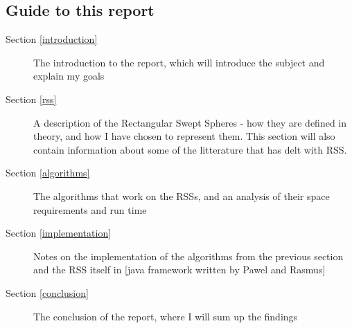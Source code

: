 \subsection{Guide to this report}
\begin{description}
\item[Section \ref{introduction}] The introduction to the report, which will introduce the subject and explain my goals
\item[Section \ref{rss}] A description of the Rectangular Swept Spheres - how they are defined in theory, and how I have chosen to represent them. This section will also contain information about some of the litterature that has delt with RSS. 
\item[Section \ref{algorithms}] The algorithms that work on the RSSs, and an analysis of their space requirements and run time 
\item[Section \ref{implementation}] Notes on the implementation of the algorithms from the previous section and the RSS itself in [java framework written by Pawel and Rasmus] 
\item[Section \ref{conclusion}] The conclusion of the report, where I will sum up the findings  
\end{description}

